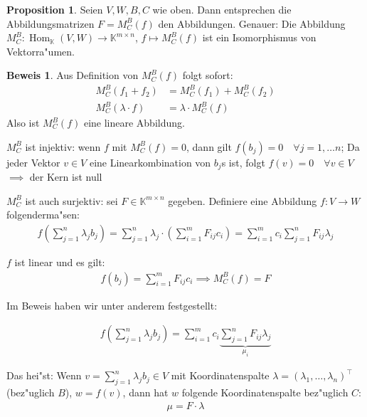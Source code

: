 \documentclass[oneside,fontsize=11pt,paper=a4,BCOR=0mm,DIV=12,automark,headsepline]{scrbook}
\DeclareMathOperator{\mHom}{Hom}
\theoremstyle{remark}
\theoremstyle{definition}
\newtheorem*{proposition}{Proposition}
\theoremstyle{definition}
\newtheorem*{prof}{Beweis}
\theoremstyle{remark}
\begin{document}
\begin{proposition} Seien \(V,W,B,C\) wie oben. Dann entsprechen die Abbildungsmatrizen
  \(F = M_C^B(f)\) den Abbildungen.  Genauer: Die Abbildung \(M_C^B: \mHom_\mathbb{K}(V,W)\to\mathbb{K}^{m\times n}\), \(f \mapsto M_C^B(f)\) ist ein Isomorphismus von
  Vektorra"umen.
\end{proposition}

\begin{prof}
  Aus Definition von \(M_C^B(f)\) folgt sofort:
  \begin{align*}
    M^B_C(f_1 + f_2) &= M_C^B(f_1) + M_C^B(f_2)\\
    M^B_C(\lambda\cdot f) &= \lambda\cdot M_C^B(f)
  \end{align*}
  Also ist \(M_C^B(f)\) eine lineare
  Abbildung.

  \(M_C^B\) ist injektiv: wenn \(f\) mit \(M^B_C(f) = 0\), dann gilt \(f(b_j) = 0\quad\forall j= 1,\dots n\); Da jeder Vektor \(v \in V\) eine Linearkombination von \(b_j\)s ist, folgt \(f(v) = 0 \quad\forall v \in V\) \(\implies\) der Kern ist null

  \(M^B_C\) ist auch surjektiv: sei \(F\in \mathbb{K}^{m\times n}\) gegeben. Definiere eine Abbildung \(f: V\to W\) folgenderma"sen:
  \begin{align*}
    f\left(\sum_{j=1}^n\lambda_jb_j\right) = \sum_{j=1}^n\lambda_j\cdot\left(\sum_{i=1}^mF_{ij}c_i\right)=\sum_{i=1}^mc_i\sum_{j=1}^nF_{ij}\lambda_j
  \end{align*}

  \(f\) ist linear und es gilt:
  \begin{align*}
    f(b_j) = \sum_{i=1}^mF_{ij}c_i \implies M^B_C(f) = F
  \end{align*}
\end{prof}

Im Beweis haben wir unter anderem festgestellt:
\begin{relation}
  \begin{align*}
    f\left(\sum_{j=1}^n\lambda_jb_j\right)=\sum_{i=1}^mc_i\underbrace{\sum_{j=1}^nF_{ij}\lambda_j}_{\mu_i}
  \end{align*}

  Das hei"st: Wenn \(v=\sum_{j=1}^n\lambda_jb_j\in V\) mit Koordinatenspalte \(\lambda = (\lambda_1,\dots,\lambda_n)^\top\) (bez"uglich \(B\)), \(w = f(v)\), dann hat \(w\) folgende Koordinatenspalte bez"uglich \(C\):
  \begin{align}
    \mu = F\cdot \lambda
  \end{align}
\end{relation}
\end{document}
